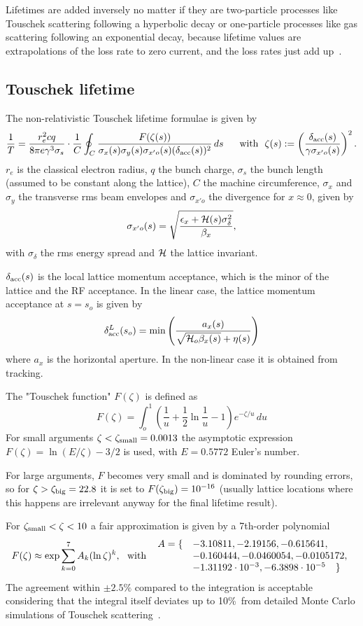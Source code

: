 \documentclass[12pt]{article}
\newcommand\beq{\begin{equation}}
\newcommand\eeq{\end{equation}}
\begin{document}
Lifetimes are added inversely no matter if they are two-particle processes like Touschek scattering following a hyperbolic decay or one-particle processes like gas scattering following an exponential decay, because lifetime values are extrapolations of the loss rate to zero current, and the loss rates just add up~\cite{asaa06}.

\subsection{\label{apptous}Touschek lifetime}
The non-relativistic Touschek lifetime formulae is given by~\cite{bruck} \cite{zap} \cite{sls1897}
\[
\frac{1}{T}=\frac{r_e^2cq}{8\pi e\gamma^3\sigma_s}
\cdot \frac{1}{C}
\oint_C \frac{F(\zeta(s))}{\sigma_x(s)\sigma_y(s)\sigma_{x'o}(s)
(\delta_{\rm acc}(s))^2}\,ds \quad \mbox{~~\rm with~~}
\zeta(s):=\left(\frac{\delta_{\rm acc}(s)}{\gamma \sigma_{x'o}(s)}\right)^2.
\]
$r_e$ is the classical electron radius, $q$ the bunch charge, $\sigma_s$ the
bunch length (assumed to be constant along the lattice),
$C$ the machine circumference, $\sigma_x$ and $\sigma_y$ the transverse
rms beam envelopes and $\sigma_{x'o}$
the divergence for $x\approx 0$, given by
\[
\sigma_{x'o}(s)=
\sqrt{\frac{\epsilon_x+{\cal H}(s)\sigma_{\delta}^2}{\beta_x}},
\]
with $\sigma_{\delta}$ the rms energy spread and ${\cal H}$ the lattice
invariant.

$\delta_{\rm acc}(s)$ is the local lattice momentum acceptance, which is the minor
of the lattice and the RF acceptance.
In the linear case, the lattice momentum acceptance at $s=s_o$ is given by
\beq\label{toudeltal}
\delta_{\rm acc}^L(s_o)=\min \left( \frac{a_x(s)}
{\sqrt{{\cal H}_o \beta_x(s)}+\eta(s)}\right)
\eeq
where $a_x$ is the horizontal aperture.
In the non-linear case it is obtained from tracking.

The "Touschek function" $F(\zeta)$ is defined as
\[
F(\zeta)=\int_o^1 \left( \frac{1}{u} +\frac{1}{2} \ln\frac{1}{u}-1\right)e^{-\zeta/u}\,du
\]
For small arguments $\zeta<\zeta_{\rm small}=0.0013$
the asymptotic expression $F(\zeta)=\ln(E/\zeta)-3/2$ is used,
with $E=0.5772$ Euler's number.

For large arguments, $F$ becomes very small
and is dominated by rounding errors, so for $\zeta > \zeta_{\rm big}=22.8$ it is set
to $F(\zeta_{\rm big})=10^{-16}$
(usually lattice locations where this happens are irrelevant anyway
for the final lifetime result).

For $\zeta_{\rm small}<\zeta<10$ a fair approximation is given by a 7th-order polynomial
\[
F(\zeta) \approx \exp \sum_{k=0}^7 A_k (\ln \zeta )^k, \mbox{\rm ~~with~~}
\begin{array}{ll}
A= \{& -3.10811,-2.19156,-0.615641, \\
& -0.160444, -0.0460054, -0.0105172, \\
& -1.31192\cdot 10^{-3}, -6.3898\cdot 10^{-5}\quad \}
\end{array}
\]
The agreement within $\pm 2.5\%$ compared to the integration is acceptable considering that
the integral itself deviates up to 10\%\ from detailed Monte Carlo simulations of
Touschek scattering~\cite{khan}.\\
\end{document}
